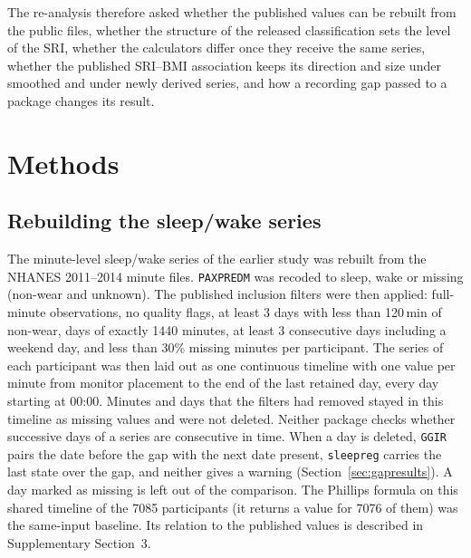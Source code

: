 \documentclass[12pt]{article}
\begin{document}
The re-analysis therefore asked whether the published values can be rebuilt from the public files, whether the structure of the released classification
sets the level of the SRI, whether the calculators differ once they receive
the same series, whether the published SRI--BMI association keeps its
direction and size under smoothed and under newly derived series, and how a
recording gap passed to a package changes its result.

\section{Methods}

\subsection{Rebuilding the sleep/wake series}
\label{sec:rebuild}
The minute-level sleep/wake series of the earlier study was rebuilt from the
NHANES 2011--2014 minute files. \texttt{PAXPREDM} was recoded to sleep, wake or missing (non-wear and unknown). The published inclusion filters were then applied: full-minute observations, no quality flags, at least 3 days with less
than 120\,min of non-wear, days of exactly 1440 minutes, at least 3
consecutive days including a weekend day, and less than 30\% missing minutes
per participant. The series of each participant was then laid out as one
continuous timeline with one value per minute from monitor placement to the
end of the last retained day, every day starting at 00:00. Minutes and days
that the filters had removed stayed in this timeline as missing values and
were not deleted. Neither package checks whether successive days of a series are consecutive in time. When a day is deleted, \texttt{GGIR} pairs the date before the gap with the next date present, \texttt{sleepreg} carries the last state over the gap, and neither gives a warning (Section~\ref{sec:gapresults}). A day marked as missing is left out of the comparison. The Phillips formula on this shared timeline of the 7085 participants (it returns
a value for 7076 of them) was the same-input baseline. Its relation to the published values is described in Supplementary Section~3.
\end{document}
